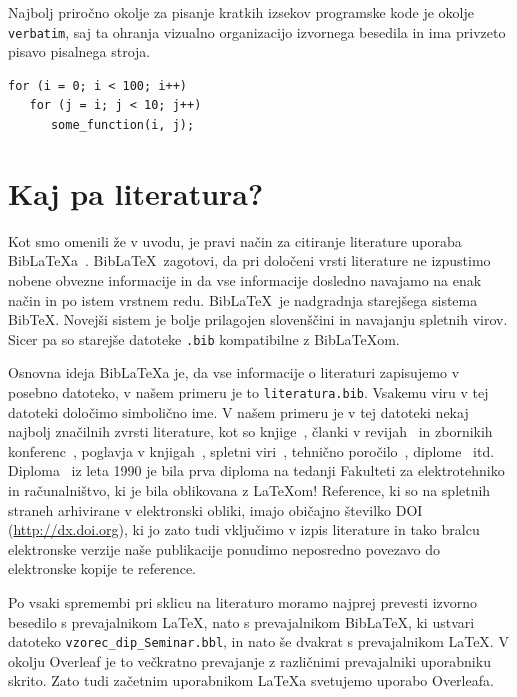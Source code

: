 \documentclass[a4paper,12pt,openright]{book}
\newcommand{\BibLaTeX}{{\sc Bib}\LaTeX}
\newcommand{\BibTeX}{{\sc Bib}\TeX}
\begin{document}
Najbolj priročno okolje za pisanje kratkih izsekov programske kode je okolje \texttt{verbatim}, saj ta ohranja vizualno organizacijo izvornega besedila in ima privzeto pisavo pisalnega stroja.

\begin{verbatim}
for (i = 0; i < 100; i++)
   for (j = i; j < 10; j++)
      some_function(i, j);
\end{verbatim}




\chapter{Kaj pa literatura?}
\label{lit}

Kot smo omenili že v uvodu, je pravi način za citiranje literature uporaba \BibLaTeX{a}~\cite{biblatex}. 
\BibLaTeX\ zagotovi, da pri določeni vrsti literature ne izpustimo 
nobene obvezne informacije 
in da vse informacije dosledno navajamo na enak način in po istem vrstnem redu.
\BibLaTeX\ je nadgradnja starejšega sistema \BibTeX. Novejši sistem je bolje prilagojen slovenščini in navajanju spletnih virov. Sicer pa so starejše datoteke \texttt{.bib} kompatibilne z \BibLaTeX om.

Osnovna ideja \BibLaTeX{a} je, da vse informacije o literaturi zapisujemo v posebno datoteko, v našem primeru je to \texttt{literatura.bib}.
Vsakemu viru v tej datoteki določimo simbolično ime.
V  našem primeru je v tej datoteki nekaj najbolj značilnih zvrsti literature, kot so knjige~\cite{lamport}, 
članki v revijah~\cite{leonardo} in zbornikih konferenc~\cite{ciuha2010visualization},
poglavja v knjigah~\cite{poglavje_springer}, 
spletni viri~\cite{slovarji,video}, 
tehnično poročilo~\cite{andersen2012kinect}, 
diplome~\cite{diploma} itd.
Diploma~\cite{diploma} iz leta 1990 je bila prva diploma na tedanji Fakulteti za elektrotehniko in računalništvo, ki je bila oblikovana z \LaTeX om!
Reference, ki so na spletnih straneh arhivirane v elektronski obliki, imajo običajno  \v stevilko DOI (\url{http://dx.doi.org}), ki jo zato tudi vključimo v izpis literature in tako bralcu elektronske verzije naše publikacije ponudimo neposredno povezavo do elektronske kopije te reference.

Po vsaki spremembi pri sklicu na literaturo moramo najprej prevesti izvorno besedilo s prevajalnikom \LaTeX, nato s prevajalnikom  \BibLaTeX, ki ustvari datoteko  {\tt vzorec\_dip\_Seminar.bbl}, in nato še dvakrat s prevajalnikom  \LaTeX.
V okolju Overleaf je to večkratno prevajanje z različnimi prevajalniki uporabniku skrito. Zato tudi začetnim uporabnikom \LaTeX a svetujemo uporabo Overleafa.
\end{document}
